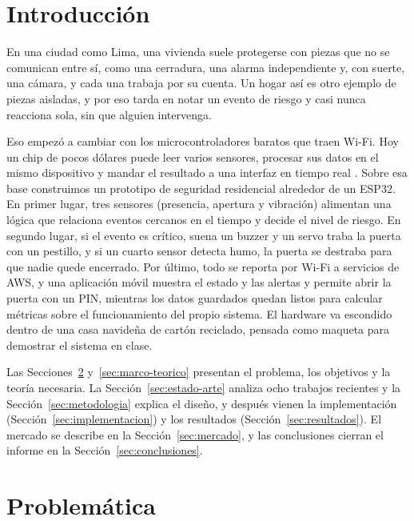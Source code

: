 \documentclass[manuscript,screen,nonacm]{acmart}
\begin{document}
\section{Introducción}
\label{sec:introduccion}

En una ciudad como Lima, una vivienda suele protegerse con piezas que no se comunican entre sí, como una cerradura, una alarma independiente y, con suerte, una cámara, y cada una trabaja por su cuenta. Un hogar así es otro ejemplo de piezas aisladas, y por eso tarda en notar un evento de riesgo y casi nunca reacciona sola, sin que alguien intervenga.

Eso empezó a cambiar con los microcontroladores baratos que traen Wi-Fi. Hoy un chip de pocos dólares puede leer varios sensores, procesar sus datos en el mismo dispositivo y mandar el resultado a una interfaz en tiempo real \cite{alfuqaha2015survey, oktafiani2025esp32}. Sobre esa base construimos un prototipo de seguridad residencial alrededor de un ESP32. En primer lugar, tres sensores (presencia, apertura y vibración) alimentan una lógica que relaciona eventos cercanos en el tiempo y decide el nivel de riesgo. En segundo lugar, si el evento es crítico, suena un buzzer y un servo traba la puerta con un pestillo, y si un cuarto sensor detecta humo, la puerta se destraba para que nadie quede encerrado. Por último, todo se reporta por Wi-Fi a servicios de AWS, y una aplicación móvil muestra el estado y las alertas y permite abrir la puerta con un PIN, mientras los datos guardados quedan listos para calcular métricas sobre el funcionamiento del propio sistema. El hardware va escondido dentro de una casa navideña de cartón reciclado, pensada como maqueta para demostrar el sistema en clase.

Las Secciones~\ref{sec:problematica} y~\ref{sec:marco-teorico} presentan el problema, los objetivos y la teoría necesaria. La Sección~\ref{sec:estado-arte} analiza ocho trabajos recientes y la Sección~\ref{sec:metodologia} explica el diseño, y después vienen la implementación (Sección~\ref{sec:implementacion}) y los resultados (Sección~\ref{sec:resultados}). El mercado se describe en la Sección~\ref{sec:mercado}, y las conclusiones cierran el informe en la Sección~\ref{sec:conclusiones}.

\section{Problemática}
\label{sec:problematica}
\end{document}

